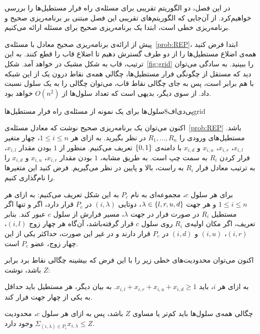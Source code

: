 

در این فصل، دو الگوریتم تقریبی برای مسئله‌ی راه فرار مستطیل‌ها را بررسی خواهیم‌کرد. از آن‌جایی که الگوریتم‌های تقریبی این فصل مبتنی بر برنامه‌ریزی صحیح و برنامه‌ریزی خطی است، ابتدا یک برنامه‌ریزی صحیح برای مسئله ارائه می‌کنیم.

پیش از ارائه‌ی برنامه‌ریزی صحیح معادل با مسئله‌ی~\ref{prob:REP}، ابتدا فرض کنید همه‌ی اضلاع مستطیل‌ها را از دو طرف گسترش دهیم تا اضلاع قاب را قطع کنند. به این ترتیب، قاب به شکل مشبک در خواهد آمد. شکل~\ref{fig:grid} را ببینید. به سادگی می‌توان دید که مستقل از چگونگی فرار مستطیل‌ها، چگالی همه‌ی نقاط درون یک  از این شبکه با هم برابر است، پس به جای چگالی نقاط قاب، می‌توان چگالی را به یک سلول نسبت داد. از سوی دیگر، بدیهی است که تعداد سلول‌ها از $O(n ^ 2)$ خواهد بود. 

‌پی‌دی‌اف{8}{سلول‌ها برای یک نمونه از مسئله‌ی راه فرار مستطیل‌ها}{grid}


اکنون می‌توان یک برنامه‌ریزی صحیح نوشت که معادل مسئله‌ی~\ref{prob:REP}  باشد. مستطیل‌های ورودی را $R_{1}, \ldots, R_{n}$ در نظر بگیرید. به ازای هر $1 \leq i \leq n$، چهار متغیر $x_{i, l}$، $x_{i, r}$، $x_{i, u}$ و $x_{i, d}$ با دامنه‌ی ${\{ 0, 1 \}}$ تعریف می‌کنیم. منظور از $1$ بودن مقدار $x_{i, l}$، فرار کردن $R_{i}$ به سمت چپ است. به طریق مشابه، $1$ بودن مقدار $x_{i, r}$، $x_{i, u}$ و $x_{i, d}$ را به ترتیب معادل فرار $R_{i}$ به راست، بالا و پایین در نظر می‌گیریم. فرض کنید این متغیر‌ها را  نام‌گذاری کنیم.

برای هر سلول $c$، مجموعه‌ای به نام $P_{c}$ به این شکل تعریف می‌کنیم: به ازای هر $1 \leq i \leq n$ و هر جهت $\lambda \in {\{ l, r, u, d \}}$، دوتایی $(i, \lambda)$ در $P_{c}$ قرار دارد، اگر و تنها اگر مستطیل $R_{i}$ در صورت فرار در جهت $\lambda$، مسیر فرارش از سلول $c$ عبور کند. بنابر تعریف، اگر مکان اولیه‌ی $R_{i}$ روی سلول $c$ قرار گرفته‌باشد، آن‌گاه هر چهار زوج $(i, l)$، $(i, r)$، $(i, u)$ و $(i, d)$ در $P_{c}$ قرار دارند و در غیر این صورت، حد‌اکثر یکی از این چهار زوج، عضو $P_{c}$ است.

اکنون می‌توان محدودیت‌های خطی زیر را با این فرض که بیشینه چگالی نقاط برد برابر $Z$ باشد، نوشت:


 به ازای هر $i$، باید $x_{i, l} + x_{i, r} + x_{i, u} + x_{i, d} \geq 1$. به بیان دیگر، هر مستطیل باید حد‌اقل به یکی از چهار جهت فرار کند.

 چگالی همه‌ی سلول‌ها باید کم‌تر یا مساوی $Z$ باشد، پس به ازای هر سلول $c$، محدودیت $\Sigma_{(i, \lambda) \in P_{c}} x_{i, \lambda} \leq Z$ وجود دارد.

